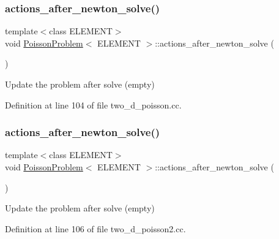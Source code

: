 \subsubsection{\texorpdfstring{actions\+\_\+after\+\_\+newton\+\_\+solve()}{actions\_after\_newton\_solve()}\hspace{0.1cm}{\footnotesize\ttfamily [1/3]}}
{\footnotesize\ttfamily template$<$class E\+L\+E\+M\+E\+NT$>$ \\
void \hyperlink{classPoissonProblem}{Poisson\+Problem}$<$ E\+L\+E\+M\+E\+NT $>$\+::actions\+\_\+after\+\_\+newton\+\_\+solve (\begin{DoxyParamCaption}{ }\end{DoxyParamCaption})\hspace{0.3cm}{\ttfamily [inline]}}



Update the problem after solve (empty) 



Definition at line 104 of file two\+\_\+d\+\_\+poisson.\+cc.

\mbox{\label{classPoissonProblem_a7a9478d8e1e5c7d3a886b00ab7d50bbd}} 
\subsubsection{\texorpdfstring{actions\+\_\+after\+\_\+newton\+\_\+solve()}{actions\_after\_newton\_solve()}\hspace{0.1cm}{\footnotesize\ttfamily [2/3]}}
{\footnotesize\ttfamily template$<$class E\+L\+E\+M\+E\+NT$>$ \\
void \hyperlink{classPoissonProblem}{Poisson\+Problem}$<$ E\+L\+E\+M\+E\+NT $>$\+::actions\+\_\+after\+\_\+newton\+\_\+solve (\begin{DoxyParamCaption}{ }\end{DoxyParamCaption})\hspace{0.3cm}{\ttfamily [inline]}}



Update the problem after solve (empty) 



Definition at line 106 of file two\+\_\+d\+\_\+poisson2.\+cc.




